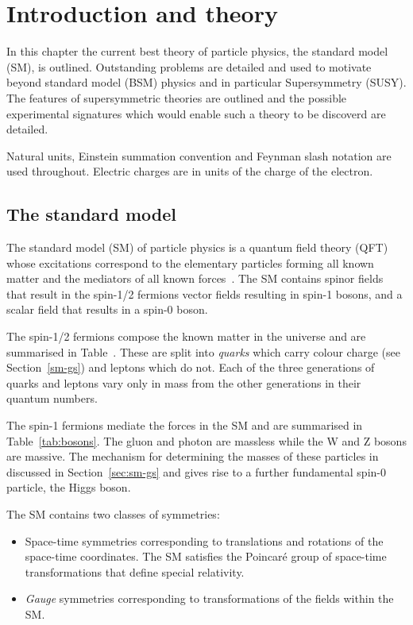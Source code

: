 \chapter{Introduction and theory}

In this chapter the current best theory of particle physics, the standard model (SM),
is outlined. Outstanding problems are detailed and used to motivate beyond
standard model (BSM) physics and in particular Supersymmetry (SUSY). 
The features of supersymmetric theories are outlined and the possible 
experimental signatures which would enable such a theory to be 
discoverd are detailed.

Natural units, Einstein summation convention
and Feynman slash notation are used throughout. Electric charges 
are in units of the charge of the electron.

\label{chap:theory}
\section{The standard model}

\label{sec:sm}
The standard model (SM) of particle physics is a quantum field theory (QFT) whose excitations
correspond to the elementary particles forming all known matter and the mediators of
all known forces~\cite{ftsm}. The SM contains spinor fields that result in the spin-1/2 fermions
vector fields resulting in spin-1 bosons, and a scalar field that results in a spin-0
boson. 

The spin-1/2 fermions compose the known matter in the universe and are summarised 
in Table~\cite{tab:fermions}. These are split into \emph{quarks} which carry colour charge (see Section~\ref{sm-gs})
and leptons which do not. Each of the three generations of quarks and leptons vary only in
mass from the other generations in their quantum numbers.

The spin-1 fermions mediate the forces in the SM and are summarised in Table~\ref{tab:bosons}. 
The gluon and photon are massless while the W and Z bosons are massive. 
The mechanism for determining the masses of these particles in discussed in 
Section~\ref{sec:sm-gs} and gives rise to a further fundamental spin-0 particle, the Higgs boson.

The SM contains two classes of symmetries:

\begin{itemize}
\item Space-time symmetries corresponding to translations and rotations of the space-time coordinates.
The SM satisfies the Poincar\'{e} group of space-time transformations that define special relativity. 
\item \emph{Gauge} symmetries corresponding to transformations of the fields within the SM.
\end{itemize}

